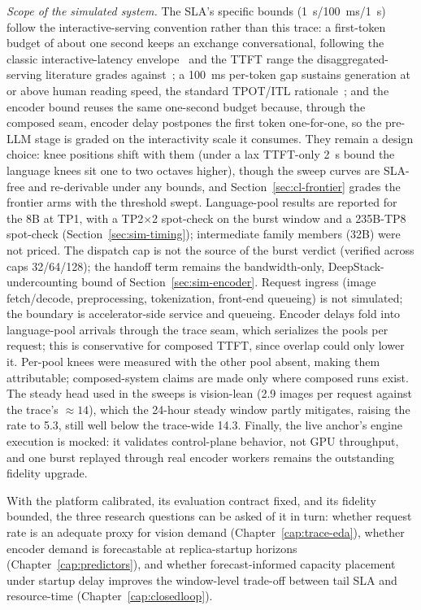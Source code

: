 \emph{Scope of the simulated system.} The SLA's specific bounds
(\SI{1}{\second}/\SI{100}{\milli\second}/\SI{1}{\second}) follow the
interactive-serving convention rather than this trace: a first-token budget
of about one second keeps an exchange conversational, following the classic
interactive-latency envelope~\cite{Dean2013TailAtScale} and the TTFT range
the disaggregated-serving literature grades
against~\cite{Zhong2024DistServe,Patel2024Splitwise}; a
\SI{100}{\milli\second} per-token gap sustains generation at or above
human reading speed, the standard TPOT/ITL
rationale~\cite{Zhong2024DistServe}; and the encoder bound reuses the same
one-second budget because, through the composed seam, encoder delay
postpones the first token one-for-one, so the pre-LLM stage is graded on the
interactivity scale it consumes. They remain a design choice: knee positions
shift with them (under a lax TTFT-only \SI{2}{\second} bound the language
knees sit one to two octaves higher), though the sweep curves are SLA-free
and re-derivable under any bounds, and Section~\ref{sec:cl-frontier} grades
the frontier arms with the threshold swept.
Language-pool results are reported for the 8B at TP1, with a TP2$\times$2
spot-check on the burst window and a 235B-TP8 spot-check
(Section~\ref{sec:sim-timing});
intermediate family members (32B) were not priced.
The dispatch cap is not the source of the burst verdict (verified across
caps 32/64/128); the handoff term remains the bandwidth-only,
DeepStack-undercounting bound of Section~\ref{sec:sim-encoder}. Request
ingress (image fetch/decode, preprocessing, tokenization, front-end
queueing) is not simulated; the boundary is accelerator-side service and
queueing. Encoder delays fold into language-pool arrivals through the trace
seam, which serializes the pools per request; this is conservative for
composed TTFT, since overlap could only lower it. Per-pool knees were measured with
the other pool absent, making them attributable; composed-system claims are
made only where composed runs exist. The steady head used in the sweeps is
vision-lean (2.9 images per request against the trace's ${\approx}14$),
which the 24-hour steady window partly mitigates, raising the rate to 5.3,
still well below the trace-wide 14.3. Finally, the live anchor's engine
execution is mocked: it validates control-plane behavior, not GPU
throughput, and one burst replayed through real encoder workers remains the
outstanding fidelity upgrade.

\bigskip
\noindent
With the platform calibrated, its evaluation contract fixed, and its
fidelity bounded, the three research questions can be asked of it in turn:
whether request rate is an adequate proxy for vision demand
(Chapter~\ref{cap:trace-eda}), whether encoder demand is forecastable at
replica-startup horizons (Chapter~\ref{cap:predictors}), and whether
forecast-informed capacity placement under startup delay improves the
window-level trade-off between tail SLA and resource-time
(Chapter~\ref{cap:closedloop}).
